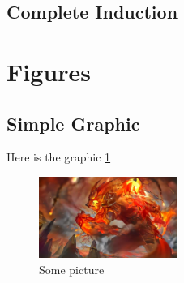 \documentclass{scrartcl}
\begin{document}
\subsection{Complete Induction}

\section{Figures}
\subsection{Simple Graphic}
Here is the graphic \ref{fig:AutumnCatch}
\noindent
\FloatBarrier
\begin{figure}[ht]
	\centering
	\includegraphics[width=0.4\textwidth]{Graphics/Herbstfang.jpg}
	\caption{Some picture}
	\label{fig:AutumnCatch}
\end{figure}
\FloatBarrier
\noindent
\end{document}
